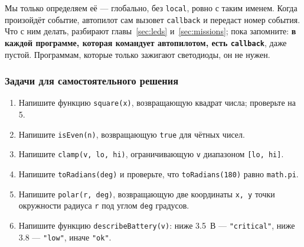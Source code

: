 Мы только определяем её --- глобально, без \verb|local|, ровно с таким именем. Когда произойдёт событие, автопилот сам вызовет \verb|callback| и передаст номер события. Что с ним делать, разбирают главы~\ref{sec:leds} и~\ref{sec:missions}; пока запомните: \textbf{в каждой программе, которая командует автопилотом, есть \texttt{callback}}, даже пустой. Программам, которые только зажигают светодиоды, он не нужен.

\subsubsection*{Задачи для самостоятельного решения}
\begin{enumerate}
  \item Напишите функцию \verb|square(x)|, возвращающую квадрат числа; проверьте на 5.
  \item Напишите \verb|isEven(n)|, возвращающую \verb|true| для чётных чисел.
  \item Напишите \verb|clamp(v, lo, hi)|, ограничивающую \verb|v| диапазоном \verb|[lo, hi]|.
  \item Напишите \verb|toRadians(deg)| и проверьте, что \verb|toRadians(180)| равно \verb|math.pi|.
  \item Напишите \verb|polar(r, deg)|, возвращающую две координаты \verb|x, y| точки окружности радиуса \verb|r| под углом \verb|deg| градусов.
  \item Напишите функцию \verb|describeBattery(v)|: ниже 3.5~В --- \verb|"critical"|, ниже 3.8 --- \verb|"low"|, иначе \verb|"ok"|.
\end{enumerate}
